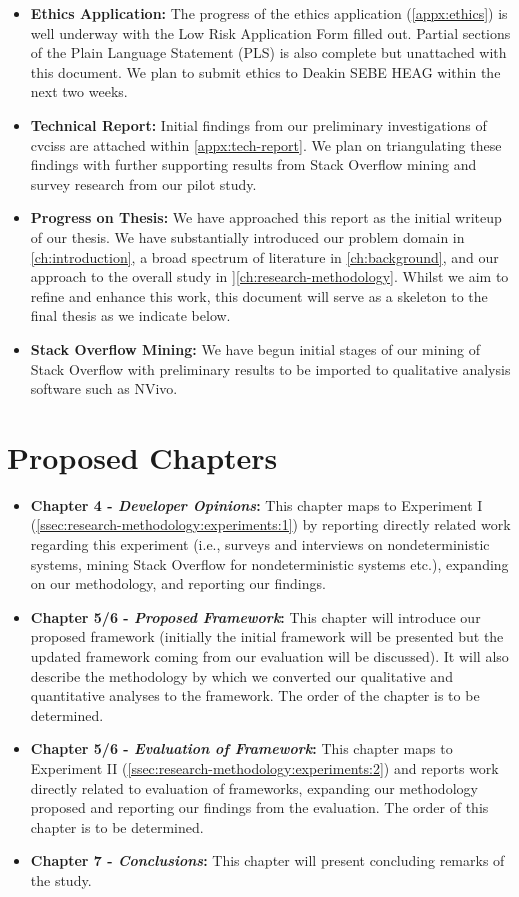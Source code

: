 \begin{itemize}
  \item \textbf{Ethics Application:} The progress of the ethics application (\cref{appx:ethics}) is well underway with the Low Risk Application Form filled out. Partial sections of the Plain Language Statement (PLS) is also complete but unattached with this document. We plan to submit ethics to Deakin SEBE HEAG within the next two weeks.
  \item \textbf{Technical Report:} Initial findings from our preliminary investigations of \glspl{cvcis} are attached within \cref{appx:tech-report}. We plan on triangulating these findings with further supporting results from Stack Overflow mining and survey research from our pilot study.
  \item \textbf{Progress on Thesis:} We have approached this report as the initial writeup of our thesis. We have substantially introduced our problem domain in \cref{ch:introduction}, a broad spectrum of literature in \cref{ch:background}, and our approach to the overall study in ]\cref{ch:research-methodology}. Whilst we aim to refine and enhance this work, this document will serve as a skeleton to the final thesis as we indicate below.
  \item \textbf{Stack Overflow Mining:} We have begun initial stages of our mining of Stack Overflow with preliminary results to be imported to qualitative analysis software such as NVivo.
\end{itemize}

\section{Proposed Chapters}

\begin{itemize}
  \item \textbf{Chapter 4 - \textit{Developer Opinions}:} This chapter maps to Experiment I (\cref{ssec:research-methodology:experiments:1}) by reporting directly related work regarding this experiment (i.e., surveys and interviews on nondeterministic systems, mining Stack Overflow for nondeterministic systems etc.), expanding on our methodology, and reporting our findings.
  \item \textbf{Chapter 5/6 - \textit{Proposed Framework}:} This chapter will introduce our proposed framework (initially the initial framework will be presented but the updated framework coming from our evaluation will be discussed). It will also describe the methodology by which we converted our qualitative and quantitative analyses to the framework. The order of the chapter is  to be determined.
  \item \textbf{Chapter 5/6 - \textit{Evaluation of Framework}:} This chapter maps to Experiment II (\cref{ssec:research-methodology:experiments:2}) and reports work directly related to evaluation of frameworks, expanding our methodology proposed and reporting our findings from the evaluation. The order of this chapter is to be determined.
  \item \textbf{Chapter 7 - \textit{Conclusions}:} This chapter will present concluding remarks of the study.
\end{itemize}


